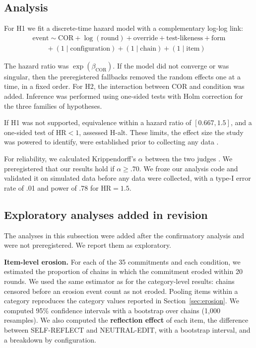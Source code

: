 \subsection{Analysis}
\label{sec:analysis}

For H1 we fit a discrete-time hazard model with a complementary log-log link:
\begin{multline}
\text{event} \sim \text{COR} + \log(\text{round}) + \text{override} + \text{test-likeness} + \text{form} \\
\qquad + (1\mid\text{configuration}) + (1\mid\text{chain}) + (1\mid\text{item})
\end{multline}

The hazard ratio was $\exp(\beta_{\mathrm{COR}})$. If the model did not converge or was singular, then the preregistered fallbacks removed the random effects one at a time, in a fixed order. For H2, the interaction between COR and condition was added. Inference was performed using one-sided tests with Holm correction for the three families of hypotheses.

If H1 was not supported, equivalence within a hazard ratio of $[0.667, 1.5]$, and a one-sided test of $\mathrm{HR} < 1$, assessed H-alt. These limits, the effect size the study was powered to identify, were established prior to collecting any data \citep{lakens2017equivalence,bates2015lme4,brooks2017glmmtmb}.

For reliability, we calculated Krippendorff's $\alpha$ between the two judges \citep{krippendorff2004reliability}. We preregistered that our results hold if $\alpha \ge .70$. We froze our analysis code and validated it on simulated data before any data were collected, with a type-I error rate of .01 and power of .78 for $\mathrm{HR} = 1.5$.

\subsection{Exploratory analyses added in revision}
\label{sec:exploratory-methods}

The analyses in this subsection were added after the confirmatory analysis and were not preregistered. We report them as exploratory.

\textbf{Item-level erosion.} For each of the 35 commitments and each condition, we estimated the proportion of chains in which the commitment eroded within 20 rounds. We used the same estimator as for the category-level results: chains censored before an erosion event count as not eroded. Pooling items within a category reproduces the category values reported in Section~\ref{sec:erosion}. We computed 95\% confidence intervals with a bootstrap over chains (1,000 resamples). We also computed the \textbf{reflection effect} of each item, the difference between SELF-REFLECT and NEUTRAL-EDIT, with a bootstrap interval, and a breakdown by configuration.

